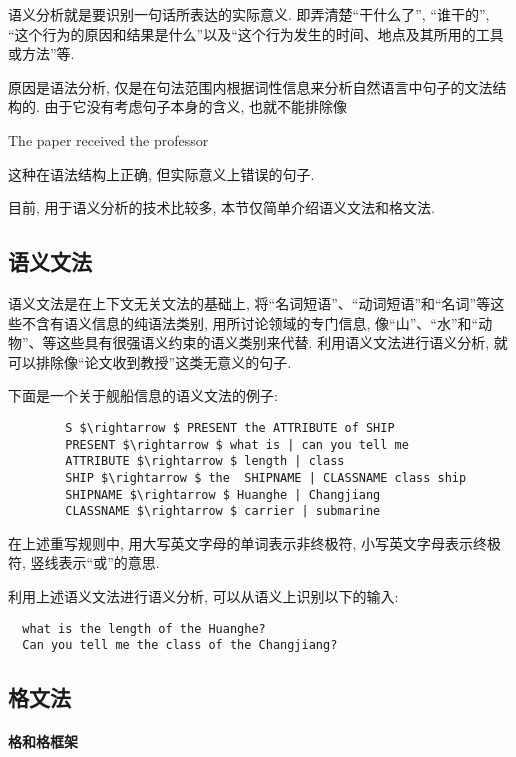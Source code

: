 语义分析就是要识别一句话所表达的实际意义. 即弄清楚“干什么了”, “谁干的”, “这个行为的原因和结果是什么”以及“这个行为发生的时间、地点及其所用的工具或方法”等.

原因是语法分析, 仅是在句法范围内根据词性信息来分析自然语言中句子的文法结构的. 由于它没有考虑句子本身的含义, 也就不能排除像
\begin{center}
    The  paper  received  the  professor
\end{center}
这种在语法结构上正确, 但实际意义上错误的句子.

目前, 用于语义分析的技术比较多, 本节仅简单介绍语义文法和格文法.
\subsection{语义文法}
    语义文法是在上下文无关文法的基础上, 将“名词短语”、“动词短语”和“名词”等这些不含有语义信息的纯语法类别, 用所讨论领域的专门信息, 像“山”、“水”和“动物”、等这些具有很强语义约束的语义类别来代替. 利用语义文法进行语义分析, 就可以排除像“论文收到教授”这类无意义的句子.

\begin{example}
下面是一个关于舰船信息的语义文法的例子:
\begin{Verbatim}
        S $\rightarrow $ PRESENT the ATTRIBUTE of SHIP
        PRESENT $\rightarrow $ what is | can you tell me
        ATTRIBUTE $\rightarrow $ length | class
        SHIP $\rightarrow $ the  SHIPNAME | CLASSNAME class ship
        SHIPNAME $\rightarrow $ Huanghe | Changjiang
        CLASSNAME $\rightarrow $ carrier | submarine
\end{Verbatim}
在上述重写规则中, 用大写英文字母的单词表示非终极符, 小写英文字母表示终极符, 竖线表示“或”的意思.
\vspace{-0.4cm}
\end{example}

利用上述语义文法进行语义分析, 可以从语义上识别以下的输入:
\begin{Verbatim}
  what is the length of the Huanghe?
  Can you tell me the class of the Changjiang?
\end{Verbatim}
\subsection{格文法}

\paragraph{格和格框架}

